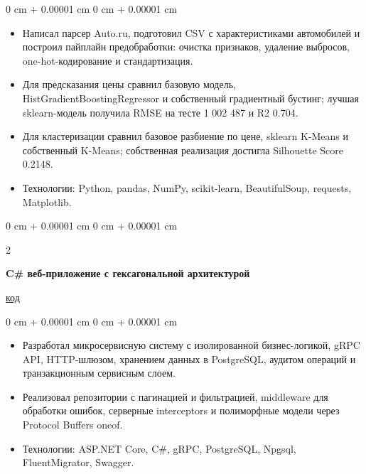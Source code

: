 \documentclass[10pt, letterpaper]{article}
\newenvironment{highlights}{
    \begin{itemize}[
        topsep=0.10 cm,
        parsep=0.10 cm,
        partopsep=0pt,
        itemsep=0pt,
        leftmargin=0 cm + 10pt
    ]
}{
    \end{itemize}
}
\newenvironment{onecolentry}{
    \begin{adjustwidth}{
        0 cm + 0.00001 cm
    }{
        0 cm + 0.00001 cm
    }
}{
    \end{adjustwidth}
}
\newenvironment{twocolentry}[2][]{
    \onecolentry
    \def\secondColumn{#2}
    \setcolumnwidth{\fill, 4.5 cm}
    \begin{paracol}{2}
}{
    \switchcolumn \raggedleft \secondColumn
    \end{paracol}
    \endonecolentry
}
\begin{document}
        \vspace{0.10 cm}
        \begin{onecolentry}
            \begin{highlights}
                \item Написал парсер Auto.ru, подготовил CSV с характеристиками автомобилей и построил пайплайн предобработки: очистка признаков, удаление выбросов, one-hot-кодирование и стандартизация.
                \item Для предсказания цены сравнил базовую модель, HistGradientBoostingRegressor и собственный градиентный бустинг; лучшая sklearn-модель получила RMSE на тесте 1 002 487 и R2 0.704.
                \item Для кластеризации сравнил базовое разбиение по цене, sklearn K-Means и собственный K-Means; собственная реализация достигла Silhouette Score 0.2148.
                \item Технологии: Python, pandas, NumPy, scikit-learn, BeautifulSoup, requests, Matplotlib.
            \end{highlights}
        \end{onecolentry}

        \vspace{0.2 cm}

        \begin{twocolentry}{
            \href{https://github.com/Komperlan/Labs/blob/main/c\%23\%20microservice/lab-3/lab-3.md}{код}
        }
            \textbf{C\# веб-приложение с гексагональной архитектурой}
        \end{twocolentry}

        \vspace{0.10 cm}
        \begin{onecolentry}
            \begin{highlights}
                \item Разработал микросервисную систему с изолированной бизнес-логикой, gRPC API, HTTP-шлюзом, хранением данных в PostgreSQL, аудитом операций и транзакционным сервисным слоем.
                \item Реализовал репозитории с пагинацией и фильтрацией, middleware для обработки ошибок, серверные interceptors и полиморфные модели через Protocol Buffers oneof.
                \item Технологии: ASP.NET Core, C\#, gRPC, PostgreSQL, Npgsql, FluentMigrator, Swagger.
            \end{highlights}
        \end{onecolentry}
\end{document}
